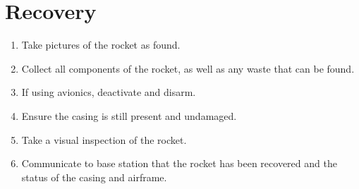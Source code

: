 \documentclass[12pt]{article}
\begin{document}
\section{Recovery}
\begin{addmargin}[3em]{3em}
	\begin{enumerate}[label=\thesection.\arabic*\quad$\square$]
		\item Take pictures of the rocket as found.
		\item Collect all components of the rocket, as well as any waste that can be found.
		\item If using avionics, deactivate and disarm.
		\item Ensure the casing is still present and undamaged.
		\item Take a visual inspection of the rocket.
		\item Communicate to base station that the rocket has been recovered and the status of the casing and airframe.
	\end{enumerate}
\end{addmargin}
\end{document}
